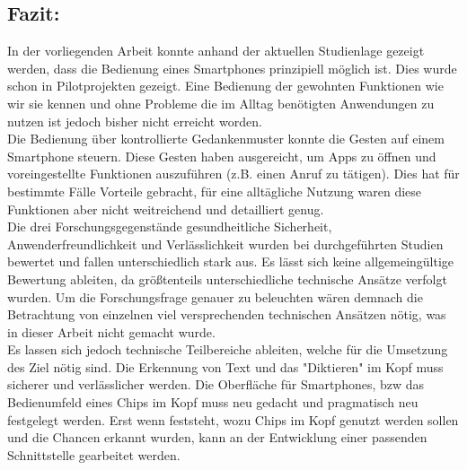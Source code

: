 \subsection{Fazit:}
  In der vorliegenden Arbeit konnte anhand der aktuellen Studienlage gezeigt werden, dass die Bedienung eines Smartphones prinzipiell möglich ist. Dies wurde schon in Pilotprojekten gezeigt. Eine Bedienung der gewohnten Funktionen wie wir sie kennen und ohne Probleme die im Alltag benötigten Anwendungen zu nutzen ist jedoch bisher nicht erreicht worden.\\
  Die Bedienung über kontrollierte Gedankenmuster konnte die Gesten auf einem Smartphone steuern. Diese Gesten haben ausgereicht, um Apps zu öffnen und voreingestellte Funktionen auszuführen (z.B. einen Anruf zu tätigen). Dies hat für bestimmte Fälle Vorteile gebracht, für eine alltägliche Nutzung waren diese Funktionen aber nicht weitreichend und detailliert genug.\\
  Die drei Forschungsgegenstände gesundheitliche Sicherheit, Anwenderfreundlichkeit und Verlässlichkeit wurden bei  durchgeführten Studien bewertet und fallen unterschiedlich stark aus. Es lässt sich keine allgemeingültige Bewertung ableiten, da größtenteils unterschiedliche technische Ansätze verfolgt wurden. Um die Forschungsfrage genauer zu beleuchten wären demnach die Betrachtung von einzelnen viel versprechenden technischen Ansätzen nötig, was in dieser Arbeit nicht gemacht wurde.\\
  Es lassen sich jedoch technische Teilbereiche ableiten, welche für die Umsetzung des Ziel nötig sind. Die Erkennung von Text und das "Diktieren" im Kopf muss sicherer und verlässlicher werden. Die Oberfläche für Smartphones, bzw das Bedienumfeld eines Chips im Kopf muss neu gedacht und pragmatisch neu festgelegt werden. Erst wenn feststeht, wozu Chips im Kopf genutzt werden sollen und die Chancen erkannt wurden, kann an der Entwicklung einer passenden Schnittstelle gearbeitet werden.
